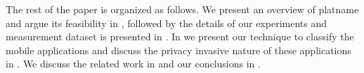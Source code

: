
The rest of the paper is organized as follows. 
We present an overview of platname and argue its feasibility in , followed by the details of our experiments and measurement dataset is presented in .
In   we present our technique to classify the mobile applications and discuss the privacy invasive nature of these applications in . 
We discuss the related work in  and our conclusions in .

